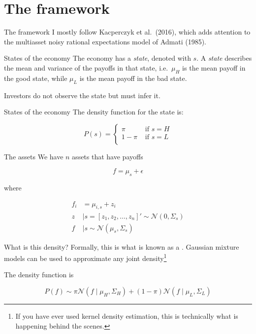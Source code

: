\documentclass[
  ignorenonframetext,
]{beamer}
\begin{document}
\hypertarget{the-framework}{%
\section{The framework}\label{the-framework}}

\begin{frame}{The framework}
\protect\hypertarget{the-framework-1}{}
I mostly follow Kacperczyk et al.~(2016), which adds attention to the
multiasset noisy rational expectations model of Admati (1985).
\end{frame}

\begin{frame}{States of the economy}
\protect\hypertarget{states-of-the-economy}{}
The economy has a \emph{state}, denoted with \(s\). A \emph{state}
describes the mean and variance of the payoffs in that state,
i.e.~\(\mu_H\) is the mean payoff in the good state, while \(\mu_L\) is
the mean payoff in the bad state.

Investors do not observe the state but must infer it.
\end{frame}

\begin{frame}{States of the economy}
\protect\hypertarget{states-of-the-economy-1}{}
The density function for the state is:

\[
P(s) = \begin{cases}
    \pi & \text{ if } s = H \\
    1-\pi & \text{ if } s = L \\
\end{cases}
\]
\end{frame}

\begin{frame}{The assets}
\protect\hypertarget{the-assets}{}
We have \(n\) assets that have payoffs

\[
f = \mu_s + \epsilon
\]

where

\begin{align}
    f_i &= \mu_{i,s} + z_i\\
    z &\mid s = [z_1,z_2, \dots, z_n]' \sim \mathcal{N}(0, \Sigma_s) \\
    f &\mid s \sim \mathcal{N}(\mu_{s}, \Sigma_s)
\end{align}
\end{frame}

\begin{frame}{What is this density?}
\protect\hypertarget{what-is-this-density}{}
Formally, this is what is known as a .
Gaussian mixture models can be used to approximate any joint
density\footnote{If you have ever used kernel density estimation, this is technically what is happening behind the scenes.}

The density function is

\[
P(f) \sim \pi \mathcal{N}(f \mid \mu_H, \Sigma_H) + (1-\pi) \mathcal{N} (f \mid \mu_L, \Sigma_L)
\]
\end{frame}
\end{document}

